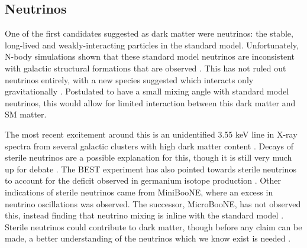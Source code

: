 \subsection{Neutrinos}
\par
One of the first candidates suggested as dark matter were neutrinos: the stable, long-lived and weakly-interacting particles in the standard model.
Unfortunately, N-body simulations shown that these standard model neutrinos are inconsistent with galactic structural formations that are observed \cite{neutrinos_and_galaxy_clustering_ref}. 
This has not ruled out neutrinos entirely, with a new species suggested which interacts only gravitationally \cite{sterile_neutrinos_ref}.
Postulated to have a small mixing angle with standard model neutrinos, this would allow for limited interaction between this dark matter and SM matter.
\par
The most recent excitement around this is an unidentified 3.55 keV line in X-ray spectra from several galactic clusters with high dark matter content \cite{sterile_neutrino_xray_decay_ref}.
Decays of sterile neutrinos are a possible explanation for this, though it is still very much up for debate \cite{xray_from_sterile_neutrons_2_ref, xray_from_sterile_neutrons_3_ref}.
The BEST experiment has also pointed towards sterile neutrinos to account for the deficit observed in germanium isotope production \cite{best_sterile_neutrino_result_ref,best_sterile_neutrino_2_ref}.
Other indications of sterile neutrinos came from MiniBooNE, where an excess in neutrino oscillations was observed.
The successor, MicroBooNE, has not observed this, instead finding that neutrino mixing is inline with the standard model \cite{miniboone_and_microboone_sterile_neutrino_ref}.
Sterile neutrinos could contribute to dark matter, though before any claim can be made, a better understanding of the neutrinos which we know exist is needed \cite{sterile_neutrino_as_dm_ref, sterile_neutrinos_dm_ref}.


